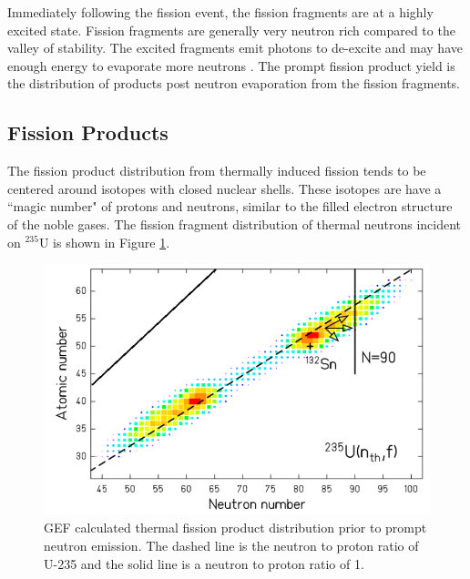 Immediately following the fission event, the fission fragments are at a highly excited state.
Fission fragments are generally very neutron rich compared to the valley of stability. 
The excited fragments emit photons to de-excite and may have enough energy to evaporate more neutrons \cite{Randrup2012}. 
The prompt fission product yield is the distribution of products post neutron evaporation from the fission fragments.  

\subsection{Fission Products}

The fission product distribution from thermally induced fission tends to be centered around isotopes with closed nuclear shells. 
These isotopes are have a ``magic number" of protons and neutrons, similar to the filled electron structure of the noble gases. 
The fission fragment distribution of thermal neutrons incident on $^{235}$U is shown in Figure \ref{fig:GEF_U}. 

\begin{figure}[h!]
	\includegraphics[width=\linewidth]{Figures/Chapter2/U_235Band.png}
	\caption[GEF calculated thermal fission product distribution prior to prompt neutron emission. The dashed line is the neutron to proton ratio of U-235 and the solid line is a neutron to proton ratio of 1]{GEF calculated thermal fission product distribution prior to prompt neutron emission. The dashed line is the neutron to proton ratio of U-235 and the solid line is a neutron to proton ratio of 1\cite{Schmidt2014}.}
	\label{fig:GEF_U}	
\end{figure}

